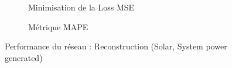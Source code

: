 \documentclass{article}
\begin{document}
    \begin{figure}[H]
        \centering
        \begin{subfigure}[t]{0.49\textwidth}
            \caption{Minimisation de la Loss MSE}
        \end{subfigure}
        \hfill
        \begin{subfigure}[t]{0.49\textwidth}
        \caption{Métrique MAPE}
    \end{subfigure}
        \caption{Performance du réseau : Reconstruction (Solar, System power generated)}
        \label{fig:test}
    \end{figure}
    
\end{document}
